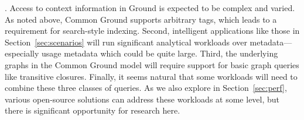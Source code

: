 \documentclass{sig-alternate}
\begin{document}



.  Access to context information in Ground is expected to be complex and varied. As noted above, Common Ground supports arbitrary tags, which leads to a requirement for search-style indexing.
Second, intelligent applications like those in Section~\ref{sec:scenarios} will run significant analytical workloads over metadata---especially usage metadata which could be quite large.  
Third, the underlying graphs in the Common Ground model will require support for basic graph queries like transitive closures. Finally, it seems natural that some workloads will need to combine these three classes of queries.
As we also explore in Section~\ref{sec:perf}, various open-source solutions can address these workloads at some level, but there is significant opportunity for research here.
\end{document}
